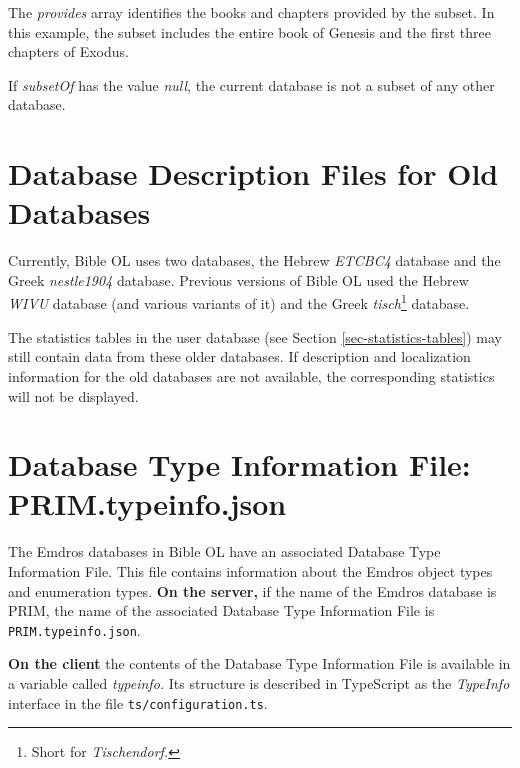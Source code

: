 \documentclass[11pt,oneside,a4paper]{memoir}
\begin{document}
The \emph{provides} array identifies the books and chapters provided by the subset. In this example,
the subset includes the entire book of Genesis and the first three chapters of Exodus.

If \emph{subsetOf} has the value \emph{null}, the current database is not a subset of any other
database.



\section{Database Description Files for Old Databases}\label{sec-old-db}

Currently, Bible OL uses two databases, the Hebrew \emph{ETCBC4} database and the Greek
\emph{nestle1904} database. Previous versions of Bible OL used the Hebrew \emph{WIVU}
database (and various variants of it) and the Greek \emph{tisch}\footnote{Short for
  \emph{Tischendorf.}} database.

The statistics tables in the user database (see Section
\ref{sec-statistics-tables}) may still contain data from these older databases. If description and
localization information for the old databases are not available, the corresponding statistics will
not be displayed.





\section{Database Type Information File: PRIM.typeinfo.json}\label{sec-tif}

The Emdros databases in Bible OL have an associated Database Type Information File. This file
contains information about the Emdros object types and
enumeration types. \textbf{On the server,} if the name of the Emdros
database is PRIM, the name of the associated Database Type Information File is
\texttt{PRIM.typeinfo.json}.

\textbf{On the client} the contents of the Database Type Information File is available in a variable
called \emph{typeinfo.}%
Its structure is described in TypeScript as the \emph{TypeInfo} interface%
in the file \texttt{ts/configuration.ts}.
\end{document}
